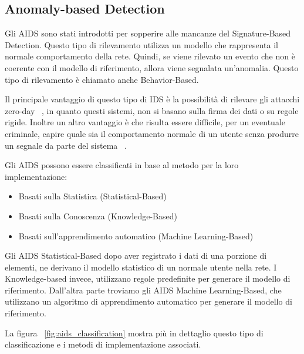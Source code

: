\subsection{Anomaly-based Detection}

Gli AIDS sono stati introdotti per sopperire alle mancanze del Signature-Based Detection.
Questo tipo di rilevamento utilizza un modello che rappresenta il normale comportamento della rete. Quindi, se viene rilevato un evento che non è coerente con il modello di riferimento, allora viene segnalata un'anomalia. Questo tipo di rilevamento è chiamato anche Behavior-Based.


Il principale vantaggio di questo tipo di IDS è la possibilità di rilevare gli attacchi zero-day ~\cite{UnsupervisedAlgorithmsDetect2021}, in quanto questi sistemi, non si basano sulla firma dei dati o su regole rigide. Inoltre un altro vantaggio è che risulta essere difficile, per un eventuale criminale, capire quale sia il comportamento normale di un utente senza produrre un segnale da parte del sistema ~\cite{SurveyIntrusionDetection2019}.


\~\cite{SurveyIntrusionDetection2019} Gli AIDS possono essere classificati in base al metodo per la loro implementazione:

\begin{itemize}
    \item Basati sulla Statistica (Statistical-Based)
    \item Basati sulla Conoscenza (Knowledge-Based)
    \item Basati sull'apprendimento automatico (Machine Learning-Based)
\end{itemize}


Gli AIDS Statistical-Based dopo aver registrato i dati di una porzione di elementi, ne derivano il modello statistico di un normale utente nella rete. 
I Knowledge-based invece, utilizzano regole predefinite per generare il modello di riferimento.
Dall'altra parte troviamo gli AIDS Machine Learning-Based, che utilizzano un algoritmo di apprendimento automatico per generare il modello di riferimento. 

La figura ~\ref{fig:aids_classification} mostra più in dettaglio questo tipo di classificazione e i metodi di implementazione associati.


